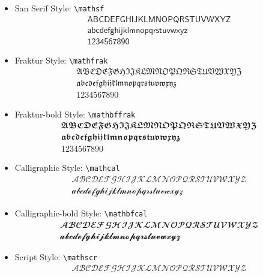 \documentclass[
	12pt,
	]{article}
\numberwithin{equation}{section}
\newcommand{\com}[1]{\texttt{\textbackslash #1}}
\theoremstyle{definition}
\theoremstyle{plain}
\theoremstyle{plain}
\theoremstyle{plain}
\begin{document}
\begin{itemize}
	
	\item San Serif Style: \com{mathsf}
	\begin{gather*}
		\mathsf{
			A B C D E F G H I J K L M N O P Q R S T U V W X Y Z
		}\\
		\mathsf{
			a b c d e f g h i j k l m n o p q r s t u v w x y z
		}\\
		\mathsf{
			1 2 3 4 5 6 7 8 9 0
		}
	\end{gather*}
	
	\item Fraktur Style: \com{mathfrak}
	\begin{gather*}
		\mathfrak{
			A B C D E F G H I J K L M N O P Q R S T U V W X Y Z
		}\\
		\mathfrak{
			a b c d e f g h i j k l m n o p q r s t u v w x y z
		}\\
		\mathfrak{
			1 2 3 4 5 6 7 8 9 0
		}
	\end{gather*}
	
	\item Fraktur-bold Style: \com{mathbffrak}
	\begin{gather*}
		\mathbffrak{
			A B C D E F G H I J K L M N O P Q R S T U V W X Y Z
		}\\
		\mathbffrak{
			a b c d e f g h i j k l m n o p q r s t u v w x y z
		}\\
		\mathbffrak{
			1 2 3 4 5 6 7 8 9 0
		}
	\end{gather*}
	
	\item Calligraphic Style: \com{mathcal}
	\begin{gather*}
		\mathcal{
			A B C D E F G H I J K L M N O P Q R S T U V W X Y Z
		}\\
		\mathcal{
			a b c d e f g h i j k l m n o p q r s t u v w x y z
		}
	\end{gather*}
	
	\item Calligraphic-bold Style: \com{mathbfcal}
	\begin{gather*}
		\mathbfcal{
			A B C D E F G H I J K L M N O P Q R S T U V W X Y Z
		}\\
		\mathbfcal{
			a b c d e f g h i j k l m n o p q r s t u v w x y z
		}
	\end{gather*}
	
	\item Script Style: \com{mathscr}
	\begin{gather*}
		\mathscr{
			A B C D E F G H I J K L M N O P Q R S T U V W X Y Z
		}
	\end{gather*}
	

\end{itemize}
\end{document}
